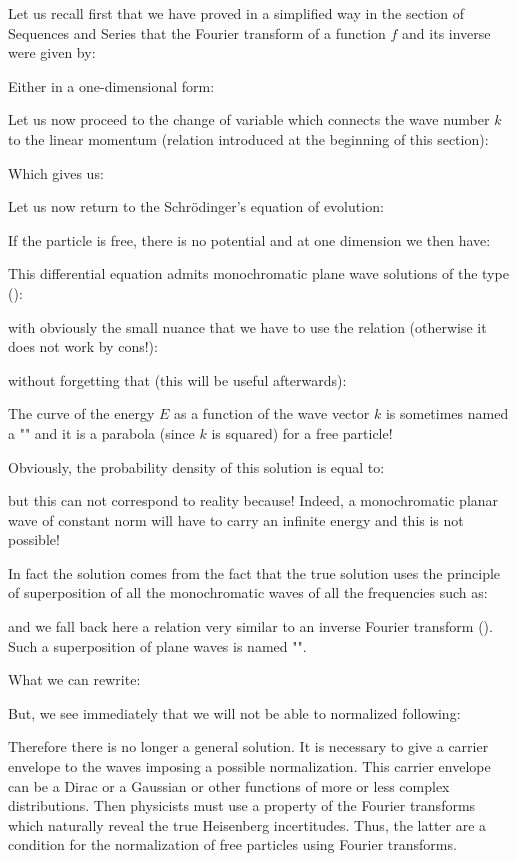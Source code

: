 Let us recall first that we have proved in a simplified way in the section of Sequences and Series that the Fourier transform of a function $f$ and its inverse were given by:
	
	Either in a one-dimensional form:
	
	Let us now proceed to the change of variable which connects the wave number $k$ to the linear momentum (relation introduced at the beginning of this section):
	
	Which gives us:
	
	Let us now return to the Schrödinger's equation of evolution:
	
	If the particle is free, there is no potential and at one dimension we then have:
	
	This differential equation admits monochromatic plane wave solutions of the type ():
	
	with obviously the small nuance that we have to use the relation (otherwise it does not work by cons!):
	
	without forgetting that (this will be useful afterwards):
	
	The curve of the energy $E$ as a function of the wave vector $k$ is sometimes named a "\label{dispersion curve}" and it is a parabola (since $k$ is squared) for a free particle!

	Obviously, the probability density of this solution is equal to:
	
	but this can not correspond to reality because! Indeed, a monochromatic planar wave of constant norm will have to carry an infinite energy and this is not possible!

	In fact the solution comes from the fact that the true solution uses the principle of superposition of all the monochromatic waves of all the frequencies such as:
	
	and we fall back here a relation very similar to an inverse Fourier transform (). Such a superposition of plane waves is named "\label{wave packet}".
	
	What we can rewrite:
	
	But, we see immediately that we will not be able to normalized following:
	
	Therefore there is no longer a general solution. It is necessary to give a carrier envelope to the waves imposing a possible normalization. This carrier envelope can be a Dirac or a Gaussian or other functions of more or less complex distributions. Then physicists must use a property of the Fourier transforms which naturally reveal the true Heisenberg incertitudes. Thus, the latter are a condition for the normalization of free particles using Fourier transforms.


